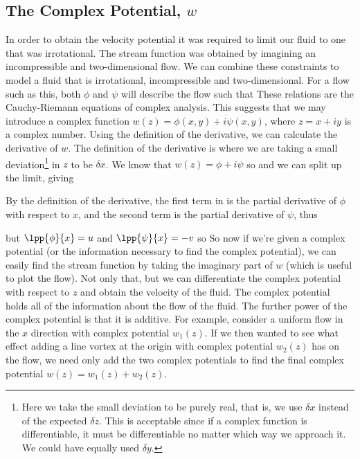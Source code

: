 \documentclass[12pt]{book}
\begin{document}
\subsection{The Complex Potential, $w$}
In order to obtain the velocity potential it was required to limit our fluid to one that was irrotational.  The stream function was obtained by imagining an incompressible and two-dimensional flow.  We can combine these constraints to model a fluid that is irrotational, incompressible and two-dimensional.  For a flow such as this, both $\phi$ and $\psi$ will describe the flow such that
These relations are the Cauchy-Riemann equations of complex analysis.  This suggests that we may introduce a complex function $w(z) = \phi(x,y) + i\psi(x,y)$, where $z=x+iy$ is a complex number.  Using the definition of the derivative, we can calculate the derivative of $w$. The definition of the derivative is
where we are taking a small deviation\footnote{Here we take the small deviation to be purely real, that is, we use $\delta x$ instead of the expected $\delta z$.  This is acceptable since if a complex function is differentiable, it must be differentiable no matter which way we approach it.  We could have equally used $\delta y$.} in $z$ to be $\delta x$.  We know that $w(z) = \phi + i\psi$ so
and we can split up the limit, giving


By the definition of the derivative, the first term in  is the partial derivative of $\phi$ with respect to $x$, and the second term is the partial derivative of $\psi$, thus


but $\lpp{\phi}{x} = u$ and $\lpp{\psi}{x} = -v$ so
So now if we're given a complex potential (or the information necessary to find the complex potential), we can easily find the stream function by taking the imaginary part of $w$ (which is useful to plot the flow).  Not only that, but we can differentiate the complex potential with respect to $z$ and obtain the velocity of the fluid.  The complex potential holds all of the information about the flow of the fluid.  The further power of the complex potential is that it is additive.  For example, consider a uniform flow in the $x$ direction with complex potential $w_1(z)$.  If we then wanted to see what effect adding a line vortex at the origin with complex potential $w_2(z)$ has on the flow, we need only add the two complex potentials to find the final complex potential \mbox{$w(z) = w_1(z) + w_2(z).$}
\end{document}
